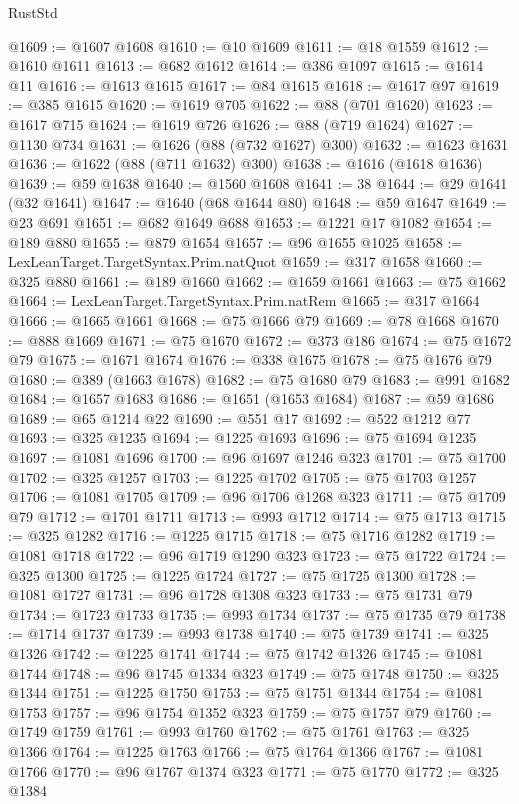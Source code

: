 \begin{lexlean}{RustStd}
\begin{coremodule}
@1609 := @1607 @1608
@1610 := @10 @1609
@1611 := @18 @1559
@1612 := @1610 @1611
@1613 := @682 @1612
@1614 := @386 @1097
@1615 := @1614 @11
@1616 := @1613 @1615
@1617 := @84 @1615
@1618 := @1617 @97
@1619 := @385 @1615
@1620 := @1619 @705
@1622 := @88 (@701 @1620)
@1623 := @1617 @715
@1624 := @1619 @726
@1626 := @88 (@719 @1624)
@1627 := @1130 @734
@1631 := @1626 (@88 (@732 @1627) @300)
@1632 := @1623 @1631
@1636 := @1622 (@88 (@711 @1632) @300)
@1638 := @1616 (@1618 @1636)
@1639 := @59 @1638
@1640 := @1560 @1608
@1641 := 38
@1644 := @29 @1641 (@32 @1641)
@1647 := @1640 (@68 @1644 @80)
@1648 := @59 @1647
@1649 := @23 @691
@1651 := @682 @1649 @688
@1653 := @1221 @17 @1082
@1654 := @189 @880
@1655 := @879 @1654
@1657 := @96 @1655 @1025
@1658 := LexLeanTarget.TargetSyntax.Prim.natQuot
@1659 := @317 @1658
@1660 := @325 @880
@1661 := @189 @1660
@1662 := @1659 @1661
@1663 := @75 @1662
@1664 := LexLeanTarget.TargetSyntax.Prim.natRem
@1665 := @317 @1664
@1666 := @1665 @1661
@1668 := @75 @1666 @79
@1669 := @78 @1668
@1670 := @888 @1669
@1671 := @75 @1670
@1672 := @373 @186
@1674 := @75 @1672 @79
@1675 := @1671 @1674
@1676 := @338 @1675
@1678 := @75 @1676 @79
@1680 := @389 (@1663 @1678)
@1682 := @75 @1680 @79
@1683 := @991 @1682
@1684 := @1657 @1683
@1686 := @1651 (@1653 @1684)
@1687 := @59 @1686
@1689 := @65 @1214 @22
@1690 := @551 @17
@1692 := @522 @1212 @77
@1693 := @325 @1235
@1694 := @1225 @1693
@1696 := @75 @1694 @1235
@1697 := @1081 @1696
@1700 := @96 @1697 @1246 @323
@1701 := @75 @1700
@1702 := @325 @1257
@1703 := @1225 @1702
@1705 := @75 @1703 @1257
@1706 := @1081 @1705
@1709 := @96 @1706 @1268 @323
@1711 := @75 @1709 @79
@1712 := @1701 @1711
@1713 := @993 @1712
@1714 := @75 @1713
@1715 := @325 @1282
@1716 := @1225 @1715
@1718 := @75 @1716 @1282
@1719 := @1081 @1718
@1722 := @96 @1719 @1290 @323
@1723 := @75 @1722
@1724 := @325 @1300
@1725 := @1225 @1724
@1727 := @75 @1725 @1300
@1728 := @1081 @1727
@1731 := @96 @1728 @1308 @323
@1733 := @75 @1731 @79
@1734 := @1723 @1733
@1735 := @993 @1734
@1737 := @75 @1735 @79
@1738 := @1714 @1737
@1739 := @993 @1738
@1740 := @75 @1739
@1741 := @325 @1326
@1742 := @1225 @1741
@1744 := @75 @1742 @1326
@1745 := @1081 @1744
@1748 := @96 @1745 @1334 @323
@1749 := @75 @1748
@1750 := @325 @1344
@1751 := @1225 @1750
@1753 := @75 @1751 @1344
@1754 := @1081 @1753
@1757 := @96 @1754 @1352 @323
@1759 := @75 @1757 @79
@1760 := @1749 @1759
@1761 := @993 @1760
@1762 := @75 @1761
@1763 := @325 @1366
@1764 := @1225 @1763
@1766 := @75 @1764 @1366
@1767 := @1081 @1766
@1770 := @96 @1767 @1374 @323
@1771 := @75 @1770
@1772 := @325 @1384

\end{coremodule}
\end{lexlean}
